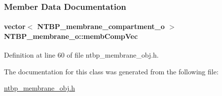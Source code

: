 \subsubsection{Member Data Documentation}
\paragraph[{membCompVec}]{\setlength{\rightskip}{0pt plus 5cm}vector$<$ {\bf NTBP\_\-membrane\_\-compartment\_\-o} $>$ {\bf NTBP\_\-membrane\_\-o::membCompVec}}\hfill\label{class_n_t_b_p__membrane__o_a845f627e7cfd6ba8d117121665c67314}


Definition at line 60 of file ntbp\_\-membrane\_\-obj.h.



The documentation for this class was generated from the following file:\begin{DoxyCompactItemize}
\item 
\hyperlink{ntbp__membrane__obj_8h}{ntbp\_\-membrane\_\-obj.h}\end{DoxyCompactItemize}
